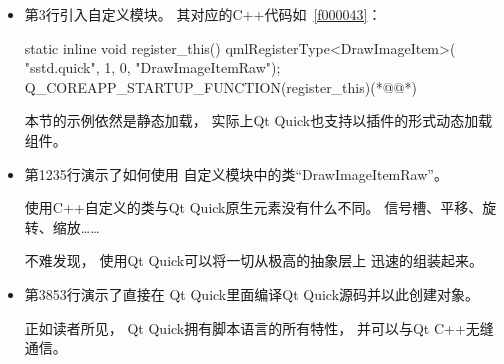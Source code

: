 \begin{itemize}

\item 第3行引入自定义模块。
其对应的C{\sourcefonttwo{}+}{\sourcefonttwo{}+}代码如\filesourcenumbernameone\ \ref{f000043}：
\label{f000043}    %
\FloatBarrier                                  %
\begin{thebookfilesourceone}[escapeinside={(*@}{@*)},
caption=GoodLuck,
title=\filesourcenumbernameone \thefilesourcenumber
]
static inline void register_this() {
    qmlRegisterType<DrawImageItem>(
        "sstd.quick",
        1, 0,
        "DrawImageItemRaw");
}
Q_COREAPP_STARTUP_FUNCTION(register_this)(*@\marginpar[\hfill\setlength\fboxsep{2pt}\fbox{\footnotesize{\kaishu\parbox{1em}{\setlength{\baselineskip}{2pt}\filesourcenumbernameone}}\footnotesize{\thefilesourcenumber}}]{\setlength\fboxsep{2pt}\fbox{\footnotesize{\kaishu\parbox{1em}{\setlength{\baselineskip}{2pt}\filesourcenumbernameone}}\footnotesize{\thefilesourcenumber}}}@*)\end{thebookfilesourceone}          %
\addtocounter{lstlisting}{-1}   %


本节的示例依然是静态加载，
实际上Qt Quick也支持以插件的形式动态加载组件。

\item 第12\raisebox{0.16ex}{\sourcefonttwo\~{}}35行演示了如何使用
自定义模块中的类“DrawImageItemRaw”。

使用C{\sourcefonttwo{}+}{\sourcefonttwo{}+}自定义的类与Qt Quick原生元素没有什么不同。
信号槽、平移、旋转、缩放……

不难发现，
使用Qt Quick可以将一切从极高的抽象层上
迅速的组装起来。

\item 第38\raisebox{0.16ex}{\sourcefonttwo\~{}}53行演示了直接在
Qt Quick里面编译Qt Quick源码并以此创建对象。

正如读者所见，
Qt Quick拥有脚本语言的所有特性，
并可以与Qt C{\sourcefonttwo{}+}{\sourcefonttwo{}+}无缝通信。

\end{itemize}

